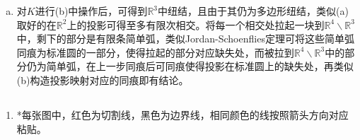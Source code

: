 \documentclass[a4paper,UTF8,fontset=windows]{ctexart}
\begin{document}
\begin{enumerate}[(1)]
\begin{enumerate}[(a)]
    \item
    对$K$进行(b)中操作后，可得到$\mathbb{R}^3$中纽结，且由于其仍为多边形纽结，类似(a)取好的在$\mathbb{R}^2$上的投影可得至多有限次相交。将每一个相交处拉起一块到$\mathbb{R}^4\backslash\mathbb{R}^3$中，剩下的部分是有限条简单弧，类似Jordan-Schoenflies定理可将这些简单弧同痕为标准圆的一部分，使得拉起的部分对应缺失处，而被拉到$\mathbb{R}^4\backslash\mathbb{R}^3$中的部分仍为简单弧，在上一步同痕后可同痕使得投影在标准圆上的缺失处，再类似(b)构造投影映射对应的同痕即有结论。
    \end{enumerate}
\end{enumerate}

\subsection{}
\begin{enumerate}[(1)]
    \item
    *每张图中，红色为切割线，黑色为边界线，相同颜色的线按照箭头方向对应粘贴。
    

\end{enumerate}
\end{document}
